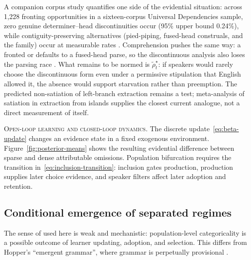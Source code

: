 A companion corpus study quantifies
one side of the evidential situation: across 1{,}228 fronting opportunities in a
sixteen-corpus Universal Dependencies sample, zero genuine determiner--head
discontinuities occur (95\% upper bound 0.24\%), while contiguity-preserving
alternatives (pied-piping, fused-head construals, and the 
family) occur at measurable rates \autocite{reynolds2026lbe}. Comprehension
pushes the same way: a fronted  or  defaults to a
fused-head parse, so the discontinuous analysis also loses the parsing race
\autocite{Culicover_Varaschin_Winkler_2022_Radical}. What remains to be normed
is $\widetilde{\rho}_t^\star$: if speakers would rarely choose the discontinuous form even
under a permissive stipulation that English allowed it, the absence would support
starvation rather than preemption. The predicted non-satiation of left-branch
extraction remains a test;  meta-analysis of
satiation in extraction from islands supplies the closest current analogue, not
a direct measurement of  itself.

\noindent\textsc{Open-loop learning and closed-loop dynamics.} The discrete
update~\eqref{eq:beta-update} changes an evidence state in a fixed exogenous
environment. Figure~\ref{fig:posterior-means} shows the resulting evidential
difference between sparse and dense attributable omissions. Population
bifurcation requires the transition in~\eqref{eq:inclusion-transition}:
inclusion gates production, production supplies later choice evidence, and
speaker filters affect later adoption and retention.

\subsection{Conditional emergence of separated regimes}
\label{sec:emergent-categoricality}

The sense of  used here is weak and mechanistic:
population-level categoricality is a possible outcome of learner updating,
adoption, and selection. This differs from Hopper's \enquote{emergent grammar}, where grammar is
perpetually provisional \autocite{hopper1987}.


